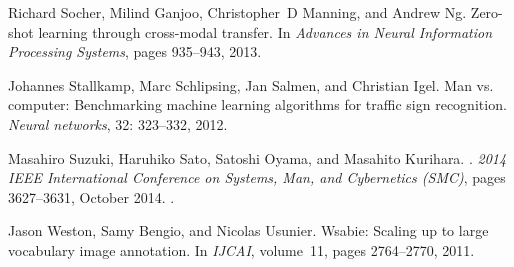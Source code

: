 \documentclass{bmvc2k}
\begin{document}
\begin{thebibliography}{23}
Richard Socher, Milind Ganjoo, Christopher~D Manning, and Andrew Ng.
\newblock Zero-shot learning through cross-modal transfer.
\newblock In \emph{Advances in Neural Information Processing Systems}, pages
  935--943, 2013.

Johannes Stallkamp, Marc Schlipsing, Jan Salmen, and Christian Igel.
\newblock Man vs. computer: Benchmarking machine learning algorithms for
  traffic sign recognition.
\newblock \emph{Neural networks}, 32: 323--332, 2012.

Masahiro Suzuki, Haruhiko Sato, Satoshi Oyama, and Masahito Kurihara.
.
\newblock \emph{2014 IEEE International Conference on Systems, Man, and
  Cybernetics (SMC)}, pages 3627--3631, October 2014.
\newblock {}.

Jason Weston, Samy Bengio, and Nicolas Usunier.
\newblock Wsabie: Scaling up to large vocabulary image annotation.
\newblock In \emph{IJCAI}, volume~11, pages 2764--2770, 2011.

\end{thebibliography}
\end{document}
